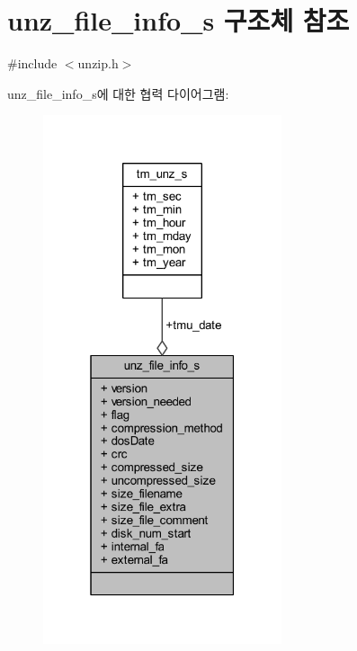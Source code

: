 \hypertarget{structunz__file__info__s}{}\section{unz\+\_\+file\+\_\+info\+\_\+s 구조체 참조}
\label{structunz__file__info__s}


{\ttfamily \#include $<$unzip.\+h$>$}



unz\+\_\+file\+\_\+info\+\_\+s에 대한 협력 다이어그램\+:\nopagebreak
\begin{figure}[H]
\begin{center}
\leavevmode
\includegraphics[width=199pt]{structunz__file__info__s__coll__graph}
\end{center}
\end{figure}
